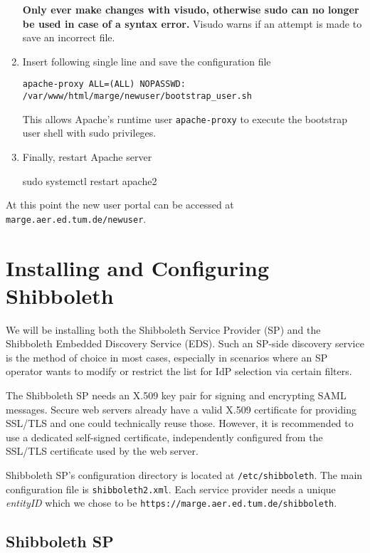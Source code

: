 \begin{enumerate}
\begin{terminal}
    \end{terminal}
    \textbf{Only ever make changes with visudo, otherwise sudo can no longer be
    used in case of a syntax error.} Visudo warns if an attempt is made to save
    an incorrect file.
    \item Insert following single line and save the configuration file
    \begin{lstlisting}[frame={l}]
        apache-proxy ALL=(ALL) NOPASSWD: /var/www/html/marge/newuser/bootstrap_user.sh
    \end{lstlisting}
    This allows Apache's runtime user \texttt{apache-proxy} to execute the
    bootstrap user shell with sudo privileges.
    \item Finally, restart Apache server
    \begin{terminal}
        sudo systemctl restart apache2
    \end{terminal}
\end{enumerate}

At this point the new user portal can be accessed at
\texttt{marge.aer.ed.tum.de/newuser}.

\section{Installing and Configuring Shibboleth}\label{section:shibboleth}

We will be installing both the Shibboleth Service Provider (SP) and the
Shibboleth Embedded Discovery Service (EDS). Such an SP-side discovery service
is the method of choice in most cases, especially in scenarios where an SP
operator wants to modify or restrict the list for IdP selection via certain
filters. 

The Shibboleth SP needs an X.509 key pair for signing and encrypting SAML
messages. Secure web servers already have a valid X.509 certificate for
providing SSL/TLS and one could technically reuse those. However, it is
recommended to use a dedicated self-signed certificate, independently configured
from the SSL/TLS certificate used by the web server.

Shibboleth SP's configuration directory is located at \texttt{/etc/shibboleth}.
The main configuration file is \texttt{shibboleth2.xml}. Each service provider
needs a unique \textit{entityID} which we chose to be
\texttt{https://marge.aer.ed.tum.de/shibboleth}.

\subsection{Shibboleth SP}

